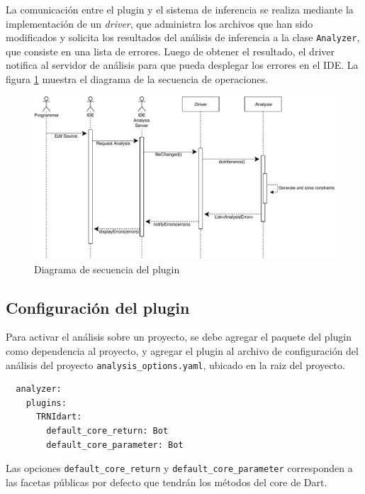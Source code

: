 La comunicación entre el plugin y el sistema de inferencia se realiza mediante la implementación de un \emph{driver}, que administra los archivos que han sido modificados y solicita los resultados del análisis de inferencia a la clase \texttt{Analyzer}, que consiste en una lista de errores. Luego de obtener el resultado, el driver notifica al servidor de análisis para que pueda desplegar los errores en el IDE. La figura \ref{seq} muestra el diagrama de la secuencia de operaciones.

\begin{figure}[ht]
  \centering
  \includegraphics[width=\textwidth]{imagenes/sequence.pdf}
  \caption{Diagrama de secuencia del plugin}
  \label{seq}
\end{figure}

\subsection{Configuración del plugin}
Para activar el análisis sobre un proyecto, se debe agregar el paquete del plugin como dependencia al proyecto, y agregar el plugin al archivo de configuración del análisis del proyecto \texttt{analysis\_options.yaml}, ubicado en la raiz del proyecto.

\begin{verbatim}
  analyzer:
    plugins:
      TRNIdart:
        default_core_return: Bot
        default_core_parameter: Bot
\end{verbatim}

Las opciones \texttt{default\_core\_return} y \texttt{default\_core\_parameter} corresponden a las facetas públicas por defecto que tendrán los métodos del core de Dart.
